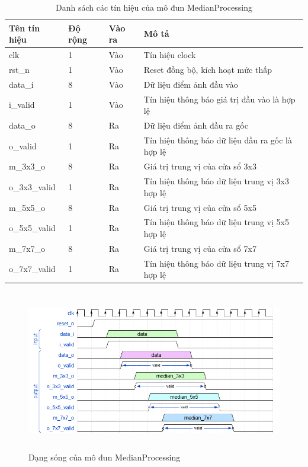 \begin{table}[!ht]
    \centering
    \renewcommand{\arraystretch}{1.3} %
    \begin{tabular}{|p{3cm} p{2cm} p{2cm} p{8cm}|}
        \hline
        \rowcolor{gray!30}
        \textbf{Tên tín hiệu} & \textbf{Độ rộng} & \textbf{Vào ra} & \textbf{Mô tả} \\
        \hline
        clk & 1 & Vào & Tín hiệu clock \\
        \hline
        rst\_n & 1 & Vào & Reset đồng bộ, kích hoạt mức thấp \\
        \hline 
        data\_i & 8 & Vào & Dữ liệu điểm ảnh đầu vào
        \\ \hline
        i\_valid & 1 & Vào & Tín hiệu thông báo giá trị đầu vào là hợp lệ
        \\ \hline
        data\_o & 8 & Ra & Dữ liệu điểm ảnh đầu ra gốc
        \\ \hline
        o\_valid & 1 & Ra & Tín hiệu thông báo dữ liệu đầu ra gốc là hợp lệ
        \\ \hline
        m\_3x3\_o & 8 & Ra & Giá trị trung vị của cửa sổ 3x3
        \\ \hline
        o\_3x3\_valid & 1 & Ra & Tín hiệu thông báo dữ liệu trung vị 3x3 hợp lệ
                \\ \hline
        m\_5x5\_o & 8 & Ra & Giá trị trung vị của cửa sổ 5x5
        \\ \hline
        o\_5x5\_valid & 1 & Ra & Tín hiệu thông báo dữ liệu trung vị 5x5 hợp lệ
                \\ \hline
        m\_7x7\_o & 8 & Ra & Giá trị trung vị của cửa sổ 7x7
        \\ \hline
        o\_7x7\_valid & 1 & Ra & Tín hiệu thông báo dữ liệu trung vị 7x7 hợp lệ
        \\ \hline
       
    \end{tabular}
    \caption{Danh sách các tín hiệu của mô đun MedianProcessing}
    \label{tab:signalListMedianProcessing}
\end{table}

\begin{figure}[!ht]
    \centering
    \includegraphics[width=1\linewidth, height =7cm]{figures/medianProcessing.png}
    \caption{Dạng sóng của mô đun MedianProcessing}
    \label{fig:medianProcessing}
\end{figure}
